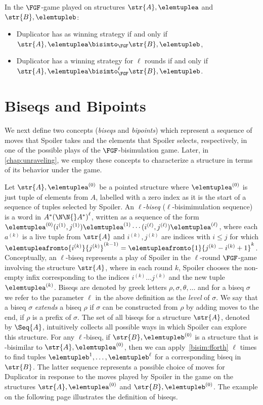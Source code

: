 \begin{corollary}
  In the $\FGF$-game played on structures $\str{A}, \elemtuplea$ and $\str{B}, \elemtupleb$:
  \begin{itemize}
    \item Duplicator has as winning strategy if and only if $\str{A}, \elemtuplea \bisimto_{\FGF} \str{B}, \elemtupleb$,
    \item Duplicator has a winning strategy for $\ell$ rounds if and only if $\str{A}, \elemtuplea \bisimto_{\FGF}^{\ell} \str{B}, \elemtupleb$.
  \end{itemize}
\end{corollary}

\section{Biseqs and Bipoints}\label{sec:biseqs-and-bipoints}
We next define two concepts (\emph{biseqs} and \emph{bipoints}) which represent a sequence of moves that Spoiler takes and the elements that Spoiler selects, respectively, in one of the possible plays of the $\FGF$-bisimulation game.
Later, in \cref{chap:unraveling}, we employ these concepts to characterize a structure in terms of its behavior under the game.

Let $\str{A}, \elemtuplea^{(0)}$ be a pointed structure where $\elemtuplea^{(0)}$ is just tuple of elements from $A$, labelled with a zero index as it is the start of a sequence of tuples selected by Spoiler.
An $\ell$-\emph{biseq} ($\ell$-bisimimulation sequence) is a word in $A^*{(\N\N{}A^{*})}^{\ell}$, written as a sequence of the form $\elemtuplea^{(0)}(i^{(1)}, j^{(1)})\elemtuplea^{(1)}\cdots(i^{(\ell)}, j^{(\ell)})\elemtuplea^{(\ell)}$, where each $a^{(k)}$ is a live tuple from $\str{A}$ and $i^{(k)}, j^{(k)}$ are indices with $i \le j$ for which $\elemtupleafromto{i^{(k)}}{j^{(k)}}^{(k-1)} = \elemtupleafromto{1}{j^{(k)}-i^{(k)}+1}^{k}$.
Conceptually, an $\ell$-biseq represents a play of Spoiler in the $\ell$-round $\FGF$-game involving the structure $\str{A}$, where in each round $k$, Spoiler chooses the non-empty infix corresponding to the indices $i^{(k)}\ldots{}j^{(k)}$ and the new tuple $\elemtuplea^{(k)}$.
Biseqs are denoted by greek letters $\rho, \sigma, \theta, \ldots$ and for
a biseq $\sigma$ we refer to the parameter $\ell$ in the above definition as the \emph{level} of $\sigma$.
We say that a biseq $\sigma$ \emph{extends} a biseq $\rho$ if $\sigma$ can be constructed from $\rho$ by adding moves to the end, \ie{} if $\rho$ is a prefix of $\sigma$.
The set of all biseqs for a structure $\str{A}$, denoted by $\Seq{A}$, intuitively collects all possible ways in which Spoiler can explore this structure.
For any $\ell$-biseq, if $\str{B}, \elemtupleb^{(0)}$ is a structure that is \FGF-bisimilar to $\str{A}, \elemtuplea^{(0)}$, then we can apply~\ref{bisim:fforth} $\ell$ times to find tuples $\elemtupleb^{1}, \ldots, \elemtupleb^{\ell}$ for a corresponding biseq in $\str{B}$.
The latter sequence represents a possible choice of moves for Duplicator in response to the moves played by Spoiler in the game on the structures $\str{A}, \elemtuplea^{(0)}$ and $\str{B}, \elemtupleb^{(0)}$. The example on the following page illustrates the definition of biseqs.\clearpage

